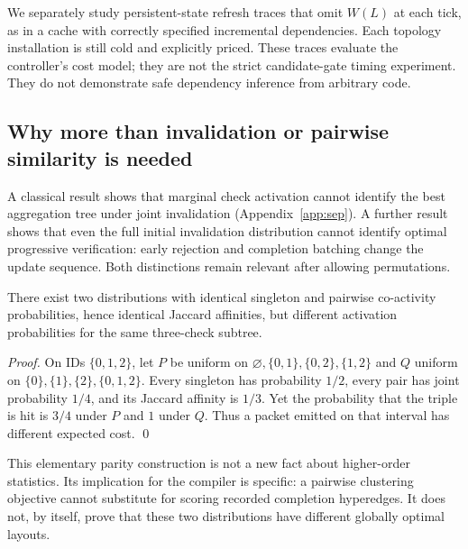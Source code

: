 We separately study persistent-state refresh traces that omit $W(L)$ at each
tick, as in a cache with correctly specified incremental dependencies. Each
topology installation is still cold and explicitly priced. These traces evaluate
the controller's cost model; they are not the strict candidate-gate timing
experiment. They do not demonstrate safe dependency inference from arbitrary
code.

\subsection{Why more than invalidation or pairwise similarity is needed}\label{sec:why}
A classical result shows that marginal check activation cannot identify the best
aggregation tree under joint invalidation (Appendix~\ref{app:sep}). A further
result shows that even the full initial invalidation distribution cannot identify
optimal progressive verification: early rejection and completion batching change
the update sequence. Both distinctions remain relevant after allowing
permutations.

\begin{proposition}\label{prop:pairwise}
There exist two distributions with identical singleton and pairwise co-activity
probabilities, hence identical Jaccard affinities, but different activation
probabilities for the same three-check subtree.
\end{proposition}
\begin{proof}
On IDs $\{0,1,2\}$, let $P$ be uniform on $\varnothing,\{0,1\},\{0,2\},\{1,2\}$
and $Q$ uniform on $\{0\},\{1\},\{2\},\{0,1,2\}$. Every singleton has
probability $1/2$, every pair has joint probability $1/4$, and its Jaccard
affinity is $1/3$. Yet the probability that the triple is hit is $3/4$ under $P$
and $1$ under $Q$. Thus a packet emitted on that interval has different expected
cost. \qed
\end{proof}
This elementary parity construction is not a new fact about higher-order
statistics. Its implication for the compiler is specific: a pairwise clustering
objective cannot substitute for scoring recorded completion hyperedges. It does
not, by itself, prove that these two distributions have different globally
optimal layouts.

